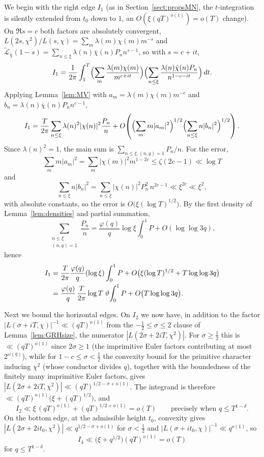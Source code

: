 \documentclass[10pt,a4paper]{amsart}
\numberwithin{equation}{section}
\begin{document}
We begin with the right edge $I_1$ (as in Section~\ref{sect:propsMN}, the $t$-integration is silently extended from $t_0$ down to $1$, an $O(\xi(qT)^{o(1)})=o(T)$ change). On $\Re s=c$ both factors are absolutely convergent, $L(2s,\chi^2)/L(s,\chi)=\sum_m\lambda(m)\chi(m)m^{-s}$ and $\widetilde{\mathcal{L}}_{\bar\chi}(1-s)=\sum_{n\le\xi}\lambda(n)\bar\chi(n)P_n n^{s-1}$, so with $s=c+it$,
\[
I_1=\frac{1}{2\pi}\int_1^T\Bigl(\sum_m\frac{\lambda(m)\chi(m)}{m^{c+it}}\Bigr)\Bigl(\sum_{n\le\xi}\frac{\lambda(n)\bar\chi(n)P_n}{n^{1-c-it}}\Bigr)\,dt.
\]
Applying Lemma~\ref{lem:MV} with $a_m=\lambda(m)\chi(m)m^{-c}$ and $b_n=\lambda(n)\bar\chi(n)P_n n^{c-1}$,
\[
I_1=\frac{T}{2\pi}\sum_{n\le\xi}\lambda(n)^2|\chi(n)|^2\frac{P_n}{n}+O\!\left(\Bigl(\sum_m m|a_m|^2\Bigr)^{1/2}\Bigl(\sum_{n\le\xi}n|b_n|^2\Bigr)^{1/2}\right).
\]
Since $\lambda(n)^2=1$, the main sum is $\sum_{n\le\xi,(n,q)=1}P_n/n$. For the error,
\[
\sum_m m|a_m|^2=\sum_m|\chi(m)|^2 m^{1-2c}\le\zeta(2c-1)\ll\log T
\]
and
\[
\sum_{n\le\xi}n|b_n|^2=\sum_{n\le\xi}|\chi(n)|^2P_n^2\,n^{2c-1}\ll\xi^{2c}\ll\xi^2,
\]
with absolute constants, so the error is $O\bigl(\xi(\log T)^{1/2}\bigr)$. By the first density of Lemma~\ref{lem:densities} and partial summation,
\[
\sum_{\substack{n\le\xi\\(n,q)=1}}\frac{P_n}{n}=\frac{\varphi(q)}{q}\log\xi\int_0^1 P+O(\log\log 3q),
\]
hence
\begin{align}
I_1&=\frac{T}{2\pi}\frac{\varphi(q)}{q}(\log\xi)\int_0^1 P+O\bigl(\xi(\log T)^{1/2}+T\log\log 3q\bigr)\notag\\
&=\frac{\varphi(q)}{q}\,\frac{T}{2\pi}\log T\;\vartheta\!\int_0^1 P+O\bigl(T\log\log 3q\bigr).\label{eq:I1-Ng}
\end{align}

Next we bound the horizontal edges. On $I_2$ we now have, in addition to the factor $|L(\sigma+iT,\chi)|^{-1}\ll(qT)^{o(1)}$ from the $-\tfrac12\le\sigma\le2$ clause of Lemma~\ref{lem:GRHsize}, the numerator $|L(2\sigma+2iT,\chi^2)|$. For $\sigma\ge\tfrac12$ this is $\ll(qT)^{o(1)}$ since $2\sigma\ge1$ (the imprimitive Euler factors contributing at most $2^{\omega(q)}$), while for $1-c\le\sigma<\tfrac12$ the convexity bound for the primitive character inducing $\chi^2$ (whose conductor divides $q$), together with the boundedness of the finitely many imprimitive Euler factors, gives $|L(2\sigma+2iT,\chi^2)|\ll(qT)^{1/2-\sigma+o(1)}$. The integrand is therefore $\ll(qT)^{o(1)}\bigl(\xi+(qT)^{1/2}\bigr)$, and
\[
I_2\ll \xi\,(qT)^{o(1)}+(qT)^{1/2+o(1)}=o(T)
\qquad\text{precisely when }q\le T^{1-\delta}.
\]
On the bottom edge, at the admissible height $t_0$, convexity gives $|L(2\sigma+2it_0,\chi^2)|\ll q^{1/2-\sigma+o(1)}$ for $\sigma<\tfrac12$ and $|L(\sigma+it_0,\chi)|^{-1}\ll q^{o(1)}$, so
\[
I_4\ll\bigl(\xi+q^{1/2}\bigr)(qT)^{o(1)}=o(T)
\]
for $q\le T^{1-\delta}$.
\end{document}
